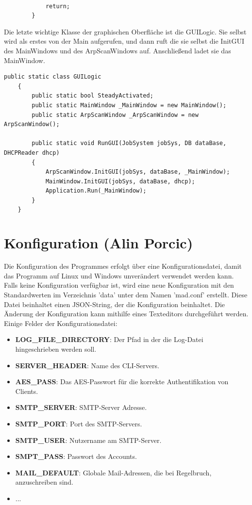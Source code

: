 \documentclass[12pt,a4paper]{report}
\begin{document}
\begin{onehalfspace}
\begin{lstlisting}
            
            return;
        }
\end{lstlisting}
Die letzte wichtige Klasse der graphischen Oberfläche ist die GUILogic. Sie selbst wird als erstes von der Main aufgerufen, und dann ruft die sie selbst die InitGUI des MainWindows und des ArpScanWindows auf. Anschließend ladet sie das MainWindow.\\
\begin{lstlisting}
public static class GUILogic
    {
        public static bool SteadyActivated;
        public static MainWindow _MainWindow = new MainWindow();
        public static ArpScanWindow _ArpScanWindow = new ArpScanWindow();

        public static void RunGUI(JobSystem jobSys, DB dataBase, DHCPReader dhcp)
        {
            ArpScanWindow.InitGUI(jobSys, dataBase, _MainWindow);
            MainWindow.InitGUI(jobSys, dataBase, dhcp);
            Application.Run(_MainWindow);           
        }
    }
\end{lstlisting}
\chapter{Konfiguration (Alin Porcic)}

Die Konfiguration des Programmes erfolgt über eine Konfigurationsdatei, damit das Programm auf Linux und Windows unverändert verwendet werden kann. Falls keine Konfiguration verfügbar ist, wird eine neue Konfiguration mit den Standardwerten im Verzeichnis 'data' unter dem Namen 'mad.conf' erstellt. Diese Datei beinhaltet einen JSON-String, der die Konfiguration beinhaltet. Die Änderung der Konfiguration kann mithilfe eines Texteditors durchgeführt werden. Einige Felder der Konfigurationsdatei:

\begin{itemize}
\item \textbf{LOG\_FILE\_DIRECTORY}: Der Pfad in der die Log-Datei hingeschrieben werden soll.
\item \textbf{SERVER\_HEADER}: Name des CLI-Servers.
\item \textbf{AES\_PASS}: Das AES-Passwort für die korrekte Authentifikation von Clients.
\item \textbf{SMTP\_SERVER}: SMTP-Server Adresse.
\item \textbf{SMTP\_PORT}: Port des SMTP-Servers.
\item \textbf{SMTP\_USER}: Nutzername am SMTP-Server.
\item \textbf{SMPT\_PASS}: Passwort des Accounts.
\item \textbf{MAIL\_DEFAULT}: Globale Mail-Adressen, die bei Regelbruch, anzuschreiben sind.
\item ...
\end{itemize}


\end{onehalfspace}
\end{document}
